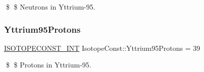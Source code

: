 \$ \$ Neutrons in Yttrium-\/95. \mbox{\label{group___isotope_const-_yttrium-_y95_ga5155b7b4f49dbd48dd85a0bec4a0f83b}} 
\subsubsection{\texorpdfstring{Yttrium95\+Protons}{Yttrium95Protons}}
{\footnotesize\ttfamily \mbox{\hyperlink{group___isotope_const-_macros_ga5f18360b3e99483a35c32d789e62621c}{I\+S\+O\+T\+O\+P\+E\+C\+O\+N\+S\+T\+\_\+\+I\+NT}} Isotope\+Const\+::\+Yttrium95\+Protons = 39}

\$ \$ Protons in Yttrium-\/95. 
